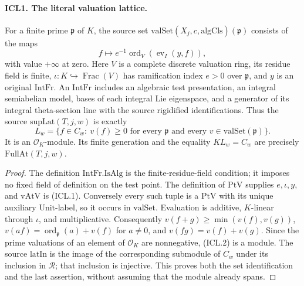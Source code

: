 \documentclass[11pt,a4paper]{article}
\numberwithin{equation}{section}
\theoremstyle{remark}\newtheorem{remark}[theorem]{Remark}
\begin{document}
\paragraph{ICL1. The literal valuation lattice.}
\label{claim:ICL1}
For a finite prime \(\mathfrak p\) of \(K\), the source set
\(\mathrm{valSet}(X_j,c,\mathrm{algCls})(\mathfrak p)\) consists of the maps
\[
 f\longmapsto e^{-1}\operatorname{ord}_{V}
                 (\operatorname{ev}_{I}(y,f)),                 \tag{ICL.1}
\]
with value \(+\infty\) at zero.  Here \(V\) is a complete discrete
valuation ring, its residue field is finite, \(\iota:K\hookrightarrow
\operatorname{Frac}(V)\) has ramification index \(e>0\) over
\(\mathfrak p\), and \(y\) is an original \(\mathrm{IntFr}\).
An \(\mathrm{IntFr}\) includes an algebraic test presentation, an integral
semiabelian model, bases of each integral Lie eigenspace, and a generator
of its integral theta-section line with the source rigidified
identifications.  Thus the source \(\mathrm{supLat}(T,j,w)\) is exactly
\[
 L_w=\{f\in C_w:\ v(f)\geq0\text{ for every }\mathfrak p
           \text{ and every }v\in\mathrm{valSet}(\mathfrak p)\}. \tag{ICL.2}
\]
It is an \(\mathcal O_K\)-module.  Its finite generation and the equality
\(K L_w=C_w\) are precisely \(\mathrm{FullAt}(T,j,w)\).
\begin{proof}
The definition \(\mathrm{IntFr.IsAlg}\) is the finite-residue-field
condition; it imposes no fixed field of definition on the test point.
The definition of \(\mathrm{PtV}\) supplies \(e,\iota,y\), and
\(\mathrm{vAtV}\) is (ICL.1).  Conversely every such tuple is a
\(\mathrm{PtV}\) with its unique auxiliary \(\mathrm{Unit}\)-label,
so it occurs in \(\mathrm{valSet}\).  Evaluation is additive,
\(K\)-linear through \(\iota\), and multiplicative.  Consequently
\(v(f+g)\geq\min(v(f),v(g))\),
\(v(af)=\operatorname{ord}_{\mathfrak p}(a)+v(f)\) for \(a\ne0\),
and \(v(fg)=v(f)+v(g)\).  Since the prime valuations of an element
of \(\mathcal O_K\) are nonnegative, (ICL.2) is a module.  The
source \(\mathrm{latIn}\) is the image of the corresponding submodule
of \(C_w\) under its inclusion in \(\mathcal R\); that inclusion is
injective.  This proves both the set identification and the last
assertion, without assuming that the module already spans.
\end{proof}

\end{document}
